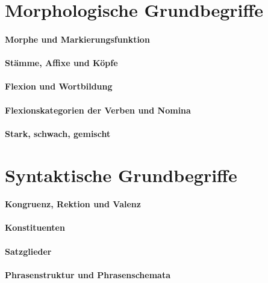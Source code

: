 \section{Morphologische Grundbegriffe}

\paragraph*{Morphe und Markierungsfunktion}

\paragraph*{Stämme, Affixe und Köpfe}

\paragraph*{Flexion und Wortbildung}

\paragraph*{Flexionskategorien der Verben und Nomina}

\paragraph*{Stark, schwach, gemischt}


\section{Syntaktische Grundbegriffe}

\paragraph*{Kongruenz, Rektion und Valenz}

\paragraph*{Konstituenten}

\paragraph*{Satzglieder}

\paragraph*{Phrasenstruktur und Phrasenschemata}

